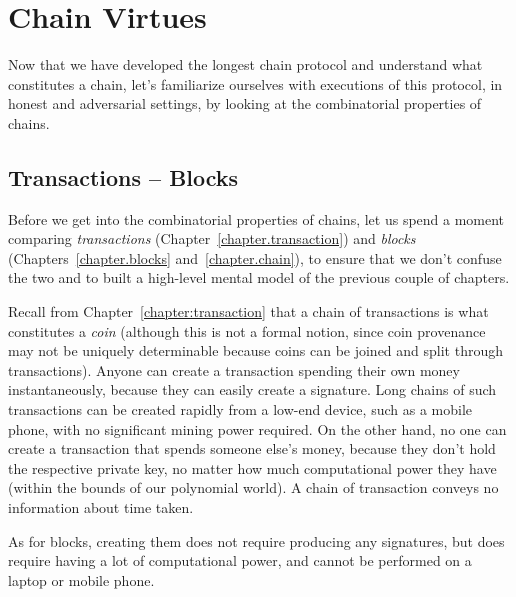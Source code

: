 \chapter{Chain Virtues}\label{chapter.virtues}

Now that we have developed the longest chain protocol and understand
what constitutes a chain, let's familiarize ourselves with executions
of this protocol, in honest and adversarial settings, by looking at
the combinatorial properties of chains.

\section{Transactions -- Blocks}

Before we get into the combinatorial properties of chains, let us spend a moment
comparing \emph{transactions} (Chapter~\ref{chapter.transaction}) and \emph{blocks}
(Chapters~\ref{chapter.blocks} and~\ref{chapter.chain}), to ensure
that we don't confuse the two and to built a high-level mental model of the
previous couple of chapters.

Recall from Chapter~\ref{chapter:transaction} that a chain of transactions is what constitutes
a \emph{coin} (although this is not a formal notion, since coin provenance may not be uniquely
determinable because coins can be joined and split through transactions).
Anyone can create a transaction spending their own money instantaneously, because
they can easily create a signature. Long chains of such transactions can be created rapidly
from a low-end device, such as a mobile phone, with no significant mining power required.
On the other hand, no one can create a transaction that spends someone else's money,
because they don't hold the respective private key, no matter how much computational
power they have (within the bounds of our polynomial world). A chain of transaction
conveys no information about time taken.

As for blocks, creating them does not require producing any signatures, but does require
having a lot of computational power, and cannot be performed on a laptop or mobile phone.

